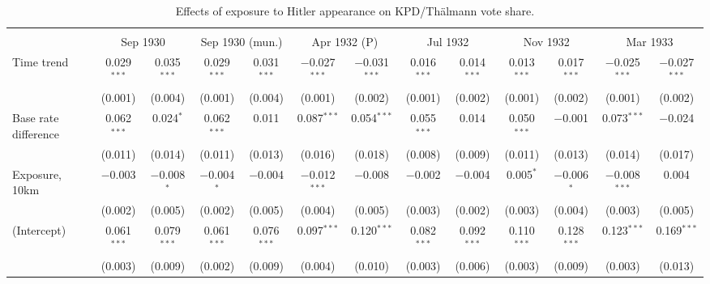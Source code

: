 
\begin{table}[!htbp] \centering 
  \caption{Effects of exposure to Hitler appearance on KPD/Thälmann vote share.\vspace{-.25cm}} 
  \label{tab:nsdap-voteshare-kpd-dd} 
\scriptsize 
\begin{tabular}{@{\extracolsep{5pt}}lcccccccccccc} 
\\[-1.8ex]\hline 
\hline \\[-1.8ex] 
 & \multicolumn{2}{c}{Sep 1930} & \multicolumn{2}{c}{Sep 1930 (mun.)} & \multicolumn{2}{c}{Apr 1932 (P)} & \multicolumn{2}{c}{Jul 1932} & \multicolumn{2}{c}{Nov 1932} & \multicolumn{2}{c}{Mar 1933} \\ 
 \cmidrule(r){2-3}\cmidrule(r){4-5}\cmidrule(r){6-7}\cmidrule(r){8-9}\cmidrule(r){10-11}\cmidrule(r){12-13}Time trend & 0.029$^{***}$ & 0.035$^{***}$ & 0.029$^{***}$ & 0.031$^{***}$ & $-$0.027$^{***}$ & $-$0.031$^{***}$ & 0.016$^{***}$ & 0.014$^{***}$ & 0.013$^{***}$ & 0.017$^{***}$ & $-$0.025$^{***}$ & $-$0.027$^{***}$ \\ 
  & (0.001) & (0.004) & (0.001) & (0.004) & (0.001) & (0.002) & (0.001) & (0.002) & (0.001) & (0.002) & (0.001) & (0.002) \\ 
  Base rate difference & 0.062$^{***}$ & 0.024$^{*}$ & 0.062$^{***}$ & 0.011 & 0.087$^{***}$ & 0.054$^{***}$ & 0.055$^{***}$ & 0.014 & 0.050$^{***}$ & $-$0.001 & 0.073$^{***}$ & $-$0.024 \\ 
  & (0.011) & (0.014) & (0.011) & (0.013) & (0.016) & (0.018) & (0.008) & (0.009) & (0.011) & (0.013) & (0.014) & (0.017) \\ 
  Exposure, 10km & $-$0.003 & $-$0.008$^{*}$ & $-$0.004$^{*}$ & $-$0.004 & $-$0.012$^{***}$ & $-$0.008 & $-$0.002 & $-$0.004 & 0.005$^{*}$ & $-$0.006$^{*}$ & $-$0.008$^{***}$ & 0.004 \\ 
  & (0.002) & (0.005) & (0.002) & (0.005) & (0.004) & (0.005) & (0.003) & (0.002) & (0.003) & (0.004) & (0.003) & (0.005) \\ 
  (Intercept) & 0.061$^{***}$ & 0.079$^{***}$ & 0.061$^{***}$ & 0.076$^{***}$ & 0.097$^{***}$ & 0.120$^{***}$ & 0.082$^{***}$ & 0.092$^{***}$ & 0.110$^{***}$ & 0.128$^{***}$ & 0.123$^{***}$ & 0.169$^{***}$ \\ 
  & (0.003) & (0.009) & (0.002) & (0.009) & (0.004) & (0.010) & (0.003) & (0.006) & (0.003) & (0.009) & (0.003) & (0.013) \\ 

\end{tabular}
\end{table}
